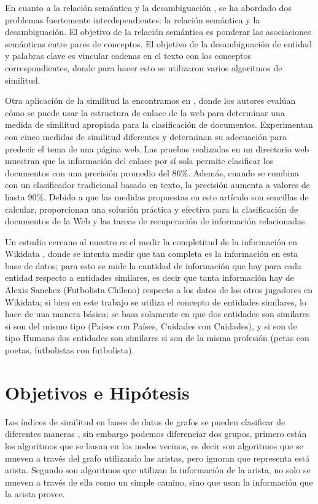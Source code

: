 En cuanto a la relación semántica y la desambiguación \cite{hulpucs2015path}, se ha abordado  dos problemas fuertemente interdependientes: la relación semántica y la desambiguación. El objetivo de la relación semántica es ponderar las asociaciones semánticas entre pares de conceptos. El objetivo de la desambiguación de entidad y palabras clave es vincular cadenas en el texto con los conceptos correspondientes, donde para hacer esto se utilizaron varios algoritmos de similitud. 

Otra aplicación de la similitud la encontramos en \cite{calado2006link}, donde los autores evalúan cómo se puede usar la estructura de enlace de la web para determinar una medida de similitud apropiada para la clasificación de documentos. Experimentan con cinco medidas de similitud diferentes y determinan su adecuación para predecir el tema de una página web. Las pruebas realizadas en un directorio web muestran que la información del enlace por sí sola permite clasificar los documentos con una precisión promedio del $86 \% $. Además, cuando se combina con un clasificador tradicional basado en texto, la precisión aumenta a valores de hasta $90 \%$. Debido a que las medidas propuestas en este artículo son sencillas de calcular, proporcionan una solución práctica y efectiva para la clasificación de documentos de la Web y las tareas de recuperación de información relacionadas. 

Un estudio cercano al nuestro es el medir la completitud de la información en Wikidata \cite{balaraman2018recoin}, donde se intenta medir que tan completa es la información en esta base de datos; para esto se mide la cantidad de información que hay para cada entidad respecto a entidades similares, es decir que tanta información hay de Alexis Sanchez (Futbolista Chileno) respecto a los datos de los otros jugadores en Wikidata; si bien en este trabajo se utiliza el concepto de entidades similares, lo hace de una manera básica; se basa solamente en que dos entidades son similares si son del mismo tipo (Países con Países, Cuidades con Cuidades), y  si son de tipo Humano dos entidades son similares si son de la misma profesión (petas con poetas, futbolistas con futbolista).

\section{Objetivos e Hipótesis}
Los índices de similitud en bases de datos de grafos se pueden clasificar de diferentes maneras \cite{lu2011link}, sin embargo podemos diferenciar dos grupos, primero están los algoritmos que se basan en los nodos vecinos, es decir son algoritmos que se mueven a través del grafo utilizando las aristas, pero ignoran que representa está arista. Segundo  son algoritmos que  utilizan la información de la arista, no solo se mueven a través de ella como un simple camino, sino que usan la información que la arista provee.
 
